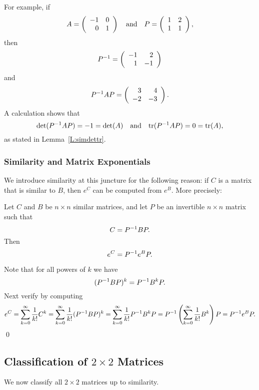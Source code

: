 For example, if
\[
A = \left(\begin{array}{rr} -1 & 0\\ 0 &1\end{array}\right) \quad\mbox{and}\quad  P = \left(\begin{array}{rr} 1 & 2\\ 1 &1\end{array}\right),
\]
then
\[
P^{-1} = \left(\begin{array}{rr} -1 & 2\\ 1 &-1\end{array}\right)
\]
and
\[
P^{-1} AP = \left(\begin{array}{rr} 3 & 4\\ -2 &-3\end{array}\right).
\]
A calculation shows that
\[
\det(P^{-1} AP)=-1=\det(A) \quad\mbox{and}\quad {\rm tr}(P^{-1} AP)=0={\rm tr}(A),
\]
as stated in Lemma~\ref{L:simdettr}.


\subsubsection*{Similarity and Matrix Exponentials}

We introduce similarity at this juncture for the following reason:
if $C$ is a matrix that is similar to $B$, then $e^C$ can be computed
from $e^B$.  More precisely:

\begin{lemma} \label{L:similarexp}
Let $C$ and $B$ be $n\times n$ similar matrices, and let $P$ be
an invertible $n\times n$ matrix such that
\[
C=P^{-1} BP.
\]
Then
\begin{equation}  \label{e:similarexp}
e^C = P^{-1} e^BP.
\end{equation}
\end{lemma}  

\proof Note that for all powers of $k$ we have
\[
(P^{-1} BP)^k = P^{-1} B^kP.
\]
Next verify  by computing
\[
e^C =\sum^{\infty}_{k=0} \frac{1}{k!}C^k
 =  \sum^{\infty}_{k=0} \frac{1}{k!}(P^{-1} BP)^k
=  \sum^{\infty}_{k=0} \frac{1}{k!}P^{-1} B^kP
= P^{-1}\left(\sum^{\infty}_{k=0} \frac{1}{k!}B^k\right)P
= P^{-1} e^B P.
\]
\qed


\subsection*{Classification of $2\times 2$ Matrices}

We now classify all $2\times 2$ matrices up to similarity.

